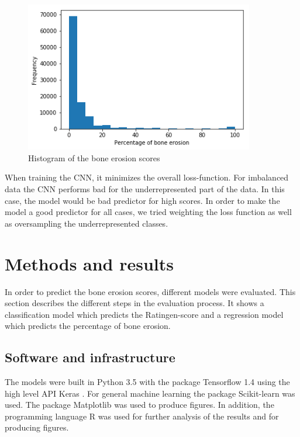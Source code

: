 \documentclass[12pt]{article}
\begin{document}
\begin{figure}[ht]
\includegraphics[width=10cm]{imbalance}	
\caption{Histogram of the bone erosion scores}
\label{fig:imbalance}
\end{figure}

When training the CNN, it minimizes the overall loss-function. For imbalanced data the CNN performs bad for the underrepresented part of the data. In this case, the model would be bad predictor for high scores. In order to make the model a good predictor for all cases, we tried weighting the loss function as well as oversampling the underrepresented classes.



\newpage
\section{Methods and results}
\label{sec:methods&results}

In order to predict the bone erosion scores, different models were evaluated. This section describes the different steps in the evaluation process. It shows a classification model which predicts the Ratingen-score and a regression model which predicts the percentage of bone erosion.

\subsection{Software and infrastructure}
The models were built in Python 3.5 \cite{python} with the package Tensorflow 1.4 \cite{tensorflow} using the high level API Keras \cite{keras}. For general machine learning the package Scikit-learn \cite{scikit-learn} was used. The package Matplotlib \cite{matplotlib} was used to produce figures. In addition, the programming language R \cite{r} was used for further analysis of the results and for producing figures.
\end{document}
